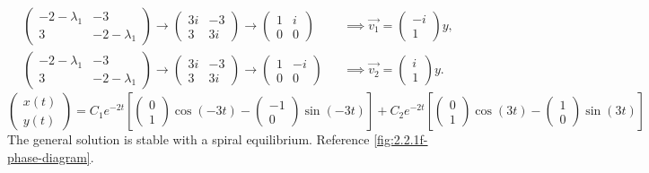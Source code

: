 \documentclass[12pt]{article}
\begin{document}
\begin{equation*}
  \begin{aligned}
    &\begin{pmatrix}-2-\lambda_1&-3\\3&-2-\lambda_1\end{pmatrix}
    \rightarrow\begin{pmatrix}3i&-3\\3&3i\end{pmatrix}
    \rightarrow\begin{pmatrix}1&i\\0&0\end{pmatrix}
    &&\implies \vec{v_1} = \begin{pmatrix}-i\\1\end{pmatrix}y, \\
    &\begin{pmatrix}-2-\lambda_1&-3\\3&-2-\lambda_1\end{pmatrix}
    \rightarrow\begin{pmatrix}3i&-3\\3&3i\end{pmatrix}
    \rightarrow\begin{pmatrix}1&-i\\0&0\end{pmatrix}
    &&\implies \vec{v_2} = \begin{pmatrix}i\\1\end{pmatrix}y.
  \end{aligned}
\end{equation*}
$$
\boxed{\begin{pmatrix}x(t)\\y(t)\end{pmatrix}=C_1e^{-2t}\left[\begin{pmatrix}0\\1\end{pmatrix}\cos(-3t)
  -\begin{pmatrix}-1\\0\end{pmatrix}\sin(-3t)\right]+
C_2e^{-2t}\left[\begin{pmatrix}0\\1\end{pmatrix}\cos(3t)
  -\begin{pmatrix}1\\0\end{pmatrix}\sin(3t)\right]}
$$
The general solution is stable with a spiral equilibrium. Reference
\cref{fig:2.2.1f-phase-diagram}.
\end{document}
